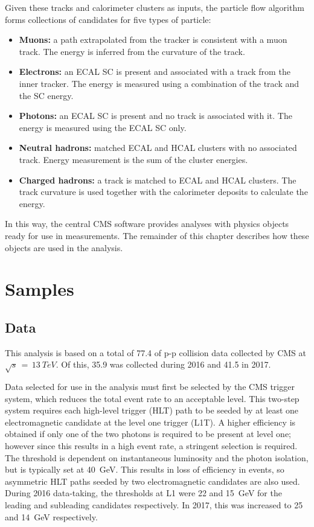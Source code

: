 Given these tracks and calorimeter clusters as inputs, the particle flow algorithm forms collections of candidates for five types of particle:
\begin{itemize}
  \item{\textbf{Muons:} a path extrapolated from the tracker is consistent with a muon track. 
                        The energy is inferred from the curvature of the track.}  %
  \item{\textbf{Electrons:} an ECAL SC is present and associated with a track from the inner tracker. 
                            The energy is measured using a combination of the track \pt and the SC energy.}
  \item{\textbf{Photons:} an ECAL SC is present and no track is associated with it.
                          The energy is measured using the ECAL SC only.}
  \item{\textbf{Neutral hadrons:} matched ECAL and HCAL clusters with no associated track.
                                 Energy measurement is the sum of the cluster energies.}
  \item{\textbf{Charged hadrons:} a track is matched to ECAL and HCAL clusters.
                                 The track curvature is used together with the calorimeter deposits to calculate the energy.}
\end{itemize}
In this way, the central CMS software provides analyses with physics objects 
ready for use in measurements.
The remainder of this chapter describes how these objects are used in the \Hgg analysis.

\section{Samples}
\subsection{Data}

This analysis is based on a total of \SI{77.4}{\fbinv} of p-p collision data collected by CMS at $\sqrt{s}\,=\,\SI{13}{TeV}$.
Of this, \SI{35.9}{\fbinv} was collected during 2016 and \SI{41.5}{\fbinv} in 2017.

Data selected for use in the analysis must first be selected by the CMS trigger system, 
which reduces the total event rate to an acceptable level.
This two-step system requires each high-level trigger (HLT) path to be seeded by at least one electromagnetic candidate at the level one trigger (L1T).
A higher efficiency is obtained if only one of the two photons is required to be present at level one; 
however since this results in a high event rate, a stringent \pt selection is required.
The threshold is dependent on instantaneous luminosity and the photon isolation, 
but is typically set at \SI{40}{GeV}.
This results in loss of efficiency in \Hgg events, so asymmetric HLT paths seeded by two electromagnetic candidates are also used.
During 2016 data-taking, the \pt thresholds at L1 were 22 and \SI{15}{GeV} for the leading and subleading candidates respectively.
In 2017, this was increased to 25 and \SI{14}{GeV} respectively. %

